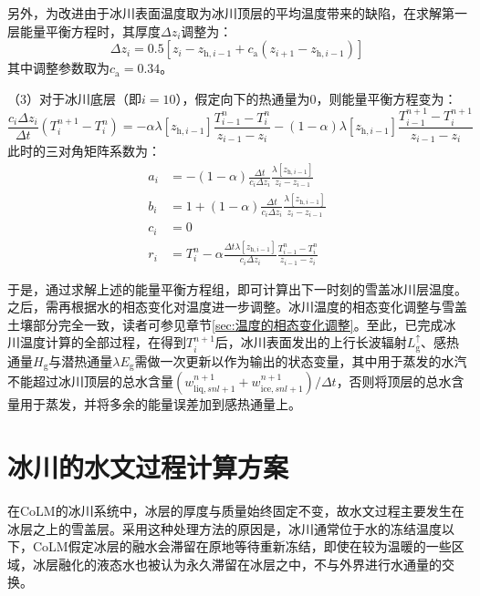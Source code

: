 另外，为改进由于冰川表面温度取为冰川顶层的平均温度带来的缺陷，在求解第一层能量平衡方程时，其厚度$\Delta z_i$调整为：
\begin{equation}
  \Delta z_i = 0.5\left[z_i-z_{\mathrm{h},i-1}+c_{\mathrm {a}} \left(z_{i+1}-z_{\mathrm{h},i-1}\right)\right]
\end{equation}
其中调整参数取为$c_{\mathrm {a}} =0.34$。

（3）对于冰川底层（即$i=10$），假定向下的热通量为0，则能量平衡方程变为：
\begin{equation}
  \frac{c_{i} \Delta z_{i}}{\Delta t}\left(T_{i}^{n+1}-T_{i}^{n}\right)=-\alpha \lambda\left[z_{\mathrm{h},i-1}\right] \frac{T_{i-1}^{n}-T_{i}^{n}}{z_{i-1}-z_{i}}-(1-\alpha) \lambda\left[z_{\mathrm{h},i-1}\right] \frac{T_{i-1}^{n+1}-T_{i}^{n+1}}{z_{i-1}-z_{i}}
\end{equation}
此时的三对角矩阵系数为：
\begin{equation}
  \begin{aligned}
    a_{i} &= -(1-\alpha) \frac{\Delta t}{c_{i} \Delta z_{i}} \frac{\lambda\left[z_{\mathrm{h},i-1}\right]}{z_{i}-z_{i-1}} \\
    b_{i} &= 1+(1-\alpha) \frac{\Delta t}{c_{i} \Delta z_{i}} \frac{\lambda\left[z_{\mathrm{h},i-1}\right]}{z_{i}-z_{i-1}} \\
    c_{i} &= 0 \\
    r_{i} &= T_{i}^{n}-\alpha \frac{\Delta t \lambda\left[z_{\mathrm{h},i-1}\right]}{c_{i} \Delta z_{i}} \frac{T_{i-1}^{n}-T_{i}^{n}}{z_{i-1}-z_{i}}
  \end{aligned}
\end{equation}

于是，通过求解上述的能量平衡方程组，即可计算出下一时刻的雪盖冰川层温度。之后，需再根据水的相态变化对温度进一步调整。冰川温度的相态变化调整与雪盖土壤部分完全一致，读者可参见章节\ref{sec:温度的相态变化调整}。至此，已完成冰川温度计算的全部过程，在得到$T^{n+1}_i$后，冰川表面发出的上行长波辐射$L_{\mathrm {g}} ^\uparrow$、感热通量$H_{\mathrm {g}} $与潜热通量$\lambda E_{\mathrm {g}} $需做一次更新以作为输出的状态变量，其中用于蒸发的水汽不能超过冰川顶层的总水含量$\left(w^{n+1}_{\mathrm{liq},snl+1}+w^{n+1}_{\mathrm{ice},snl+1}\right)/\Delta t$，否则将顶层的总水含量用于蒸发，并将多余的能量误差加到感热通量上。


\section{冰川的水文过程计算方案}
在CoLM的冰川系统中，冰层的厚度与质量始终固定不变，故水文过程主要发生在冰层之上的雪盖层。采用这种处理方法的原因是，冰川通常位于水的冻结温度以下，CoLM假定冰层的融水会滞留在原地等待重新冻结，即使在较为温暖的一些区域，冰层融化的液态水也被认为永久滞留在冰层之中，不与外界进行水通量的交换。

